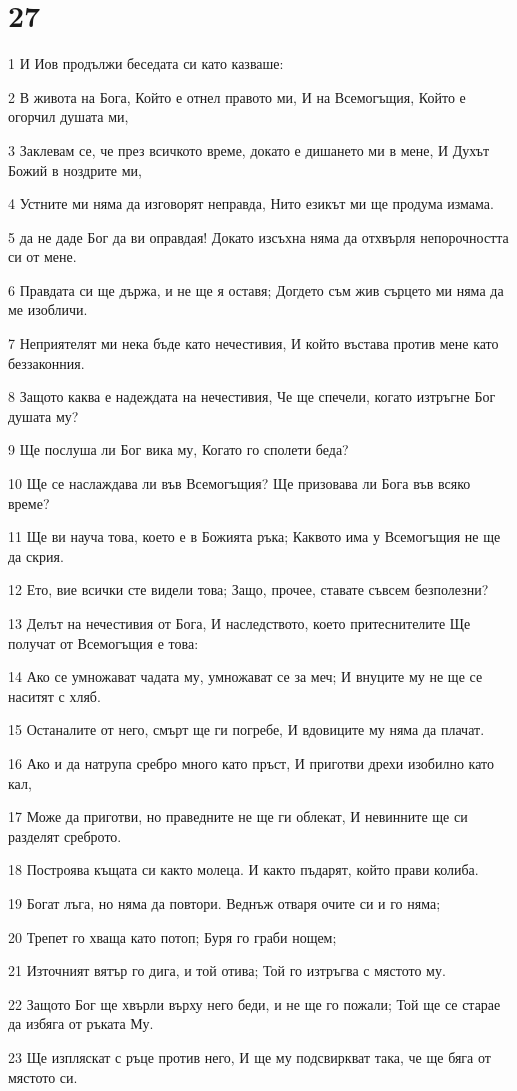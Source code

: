 \chapter{27}

\par 1 И Иов продължи беседата си като казваше:
\par 2 В живота на Бога, Който е отнел правото ми, И на Всемогъщия, Който е огорчил душата ми,
\par 3 Заклевам се, че през всичкото време, докато е дишането ми в мене, И Духът Божий в ноздрите ми,
\par 4 Устните ми няма да изговорят неправда, Нито езикът ми ще продума измама.
\par 5 да не даде Бог да ви оправдая! Докато изсъхна няма да отхвърля непорочността си от мене.
\par 6 Правдата си ще държа, и не ще я оставя; Догдето съм жив сърцето ми няма да ме изобличи.
\par 7 Неприятелят ми нека бъде като нечестивия, И който въстава против мене като беззаконния.
\par 8 Защото каква е надеждата на нечестивия, Че ще спечели, когато изтръгне Бог душата му?
\par 9 Ще послуша ли Бог вика му, Когато го сполети беда?
\par 10 Ще се наслаждава ли във Всемогъщия? Ще призовава ли Бога във всяко време?
\par 11 Ще ви науча това, което е в Божията ръка; Каквото има у Всемогъщия не ще да скрия.
\par 12 Ето, вие всички сте видели това; Защо, прочее, ставате съвсем безполезни?
\par 13 Делът на нечестивия от Бога, И наследството, което притеснителите Ще получат от Всемогъщия е това:
\par 14 Ако се умножават чадата му, умножават се за меч; И внуците му не ще се наситят с хляб.
\par 15 Останалите от него, смърт ще ги погребе, И вдовиците му няма да плачат.
\par 16 Ако и да натрупа сребро много като пръст, И приготви дрехи изобилно като кал,
\par 17 Може да приготви, но праведните не ще ги облекат, И невинните ще си разделят среброто.
\par 18 Построява къщата си както молеца. И както пъдарят, който прави колиба.
\par 19 Богат лъга, но няма да повтори. Веднъж отваря очите си и го няма;
\par 20 Трепет го хваща като потоп; Буря го граби нощем;
\par 21 Източният вятър го дига, и той отива; Той го изтръгва с мястото му.
\par 22 Защото Бог ще хвърли върху него беди, и не ще го пожали; Той ще се старае да избяга от ръката Му.
\par 23 Ще изпляскат с ръце против него, И ще му подсвиркват така, че ще бяга от мястото си.

